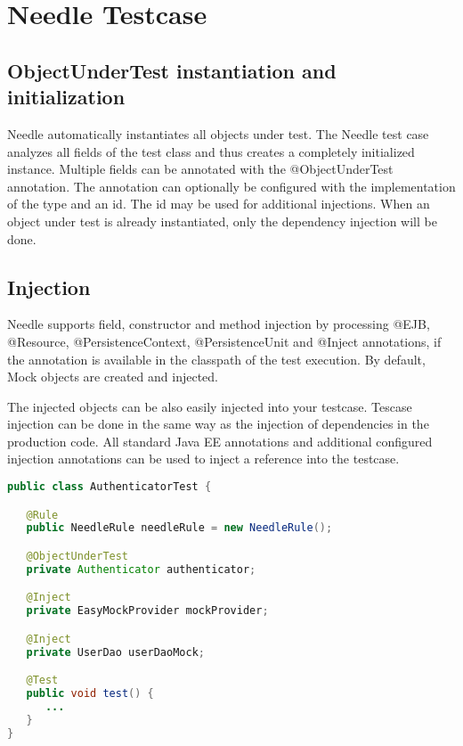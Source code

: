 \chapter{Needle Testcase}

\section{ObjectUnderTest instantiation and initialization}
\label{sec: ObjectUnderTest}

Needle automatically instantiates all objects under test. The Needle test case analyzes all fields of the test class and thus creates a completely initialized instance.
Multiple fields can be annotated with the @ObjectUnderTest annotation. The annotation can optionally be configured with the implementation of the type and an id.
The id may be used for additional injections. When an object under test is already instantiated, only the dependency injection will be done.


\section{Injection}
\label{sec:Injection}

Needle supports field, constructor and method injection by processing @EJB, @Resource, @PersistenceContext, @PersistenceUnit
and @Inject annotations, if the annotation is available in the classpath of the test execution. By default, Mock objects are created and injected.

The injected objects can be also easily injected into your testcase.
Tescase injection can be done in the same way as the injection of dependencies in the production code.
All standard Java EE annotations and additional configured injection annotations can be used to inject a reference into the testcase.

\begin{lstlisting}[language={JAVA},caption=Testcase injection]
public class AuthenticatorTest {

   @Rule
   public NeedleRule needleRule = new NeedleRule();

   @ObjectUnderTest
   private Authenticator authenticator;

   @Inject
   private EasyMockProvider mockProvider;

   @Inject
   private UserDao userDaoMock;

   @Test
   public void test() {
      ...
   }
}
\end{lstlisting}

